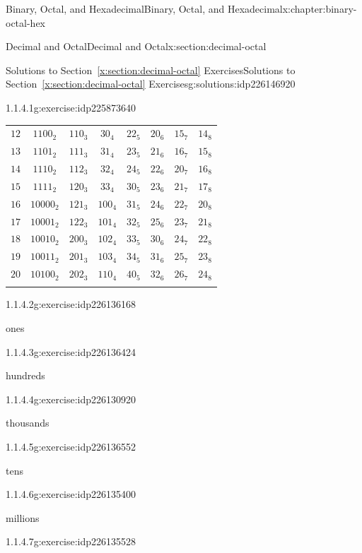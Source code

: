 \documentclass[twoside,10pt,]{book}
\newcommand{\xreffont}{\relax}
\numberwithin{equation}{section}
\newcommand{\hrulethin}  {\noalign{\hrule height 0.04em}}
\newcommand{\hrulethick} {\noalign{\hrule height 0.11em}}
\begin{document}
\begin{chapterptx}{Binary, Octal, and Hexadecimal}{}{Binary, Octal, and Hexadecimal}{}{}{x:chapter:binary-octal-hex}
\begin{sectionptx}{Decimal and Octal}{}{Decimal and Octal}{}{}{x:section:decimal-octal}
\begin{solutions-subsection}{Solutions to Section~{\xreffont\ref*{x:section:decimal-octal}} Exercises}{}{Solutions to Section~{\xreffont\ref*{x:section:decimal-octal}} Exercises}{}{}{g:solutions:idp226146920}
\begin{divisionsolution}{1.1.4.1}{}{g:exercise:idp225873640}
\begin{center}
{\begin{tabular}{cccccccc}
\(12\)&\(1100_2\)&\(110_3\)&\(30_4\)&\(22_5\)&\(20_6\)&\(15_7\)&\(14_8\)\tabularnewline\hrulethin
\(13\)&\(1101_2\)&\(111_3\)&\(31_4\)&\(23_5\)&\(21_6\)&\(16_7\)&\(15_8\)\tabularnewline\hrulethin
\(14\)&\(1110_2\)&\(112_3\)&\(32_4\)&\(24_5\)&\(22_6\)&\(20_7\)&\(16_8\)\tabularnewline\hrulethin
\(15\)&\(1111_2\)&\(120_3\)&\(33_4\)&\(30_5\)&\(23_6\)&\(21_7\)&\(17_8\)\tabularnewline\hrulethin
\(16\)&\(10000_2\)&\(121_3\)&\(100_4\)&\(31_5\)&\(24_6\)&\(22_7\)&\(20_8\)\tabularnewline\hrulethin
\(17\)&\(10001_2\)&\(122_3\)&\(101_4\)&\(32_5\)&\(25_6\)&\(23_7\)&\(21_8\)\tabularnewline\hrulethin
\(18\)&\(10010_2\)&\(200_3\)&\(102_4\)&\(33_5\)&\(30_6\)&\(24_7\)&\(22_8\)\tabularnewline\hrulethin
\(19\)&\(10011_2\)&\(201_3\)&\(103_4\)&\(34_5\)&\(31_6\)&\(25_7\)&\(23_8\)\tabularnewline\hrulethin
\(20\)&\(10100_2\)&\(202_3\)&\(110_4\)&\(40_5\)&\(32_6\)&\(26_7\)&\(24_8\)\tabularnewline\hrulethick
\end{tabular}
}%
\end{center}%
%
\end{divisionsolution}%
\begin{exercisegroup}
\begin{divisionsolutioneg}{1.1.4.2}{}{g:exercise:idp226136168}%
\par\smallskip%
\noindent\hypertarget{g:solution:idp226132712-main}{}ones\end{divisionsolutioneg}%
\begin{divisionsolutioneg}{1.1.4.3}{}{g:exercise:idp226136424}%
\par\smallskip%
\noindent\hypertarget{g:solution:idp226136936-main}{}hundreds\end{divisionsolutioneg}%
\begin{divisionsolutioneg}{1.1.4.4}{}{g:exercise:idp226130920}%
\par\smallskip%
\noindent\hypertarget{g:solution:idp226133992-main}{}thousands\end{divisionsolutioneg}%
\begin{divisionsolutioneg}{1.1.4.5}{}{g:exercise:idp226136552}%
\par\smallskip%
\noindent\hypertarget{g:solution:idp226134632-main}{}tens\end{divisionsolutioneg}%
\begin{divisionsolutioneg}{1.1.4.6}{}{g:exercise:idp226135400}%
\par\smallskip%
\noindent\hypertarget{g:solution:idp226131944-main}{}millions\end{divisionsolutioneg}%
\begin{divisionsolutioneg}{1.1.4.7}{}{g:exercise:idp226135528}%

\end{divisionsolutioneg}
\end{exercisegroup}
\end{solutions-subsection}
\end{sectionptx}
\end{chapterptx}
\end{document}
